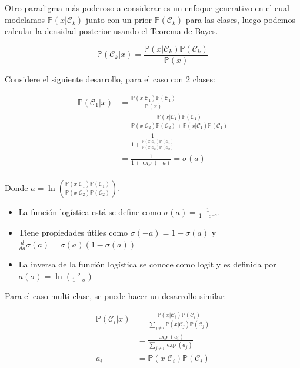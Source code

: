 Otro paradigma más poderoso a considerar es un enfoque generativo en el cual modelamos $\mathbb{P}(x|\mathcal{C}_k)$ junto con un prior $\mathbb{P}(\mathcal{C}_k)$ para las clases, luego podemos calcular la densidad posterior usando el Teorema de Bayes.

\begin{equation}
	\mathbb{P}(\mathcal{C}_k|x) = \frac{\mathbb{P}(x|\mathcal{C}_k)\mathbb{P}(\mathcal{C}_k)}{\mathbb{P}(x)}
\end{equation}

Considere el siguiente desarrollo, para el caso con 2 clases:

\begin{align}
	\mathbb{P}(\mathcal{C}_1|x) &= \frac{\mathbb{P}(x|\mathcal{C}_1)\mathbb{P}(\mathcal{C}_1)}{\mathbb{P}(x)}\\
	&= \frac{\mathbb{P}(x|\mathcal{C}_1)\mathbb{P}(\mathcal{C}_1)}{\mathbb{P}(x|\mathcal{C}_2)\mathbb{P}(\mathcal{C}_2)+\mathbb{P}(x|\mathcal{C}_1)\mathbb{P}(\mathcal{C}_1)}\\
	&=\frac{1}{1+\frac{\mathbb{P}(x|\mathcal{C}_1)\mathbb{P}(\mathcal{C}_1)}{\mathbb{P}(x|\mathcal{C}_2)\mathbb{P}(\mathcal{C}_2)}}\\
	&=\frac{1}{1+\exp(-a)} = \sigma(a)\\
\end{align}

Donde $a = \ln(\frac{\mathbb{P}(x|\mathcal{C}_1)\mathbb{P}(\mathcal{C}_1)}{\mathbb{P}(x|\mathcal{C}_2)\mathbb{P}(\mathcal{C}_2)})$.

\begin{itemize}
	\item La función logística está se define como $\sigma(a) = \frac{1}{1+e^{-a}}$.
	
	\item Tiene propiedades útiles como $\sigma(-a)=1-\sigma(a)$ y $\frac{d}{da}\sigma(a)=\sigma(a)(1-\sigma(a))$
	
	\item La inversa de la función logística se conoce como logit y es definida por $a(\sigma)=\ln(\frac{\sigma}{1-\sigma})$
\end{itemize}

Para el caso multi-clase, se puede hacer un desarrollo similar:

\begin{align}
	\mathbb{P}(\mathcal{C}_i | x) &= \frac{\mathbb{P}(x | \mathcal{C}_i)\mathbb{P}(\mathcal{C}_i)}{\sum_{j\neq i}\mathbb{P}(x | \mathcal{C}_j)\mathbb{P}(\mathcal{C}_j)}\\
	&= \frac{\exp(a_i)}{\sum_{j\neq i}\exp(a_j)}\\
	a_i &= \mathbb{P}(x | \mathcal{C}_i)\mathbb{P}(\mathcal{C}_i)
\end{align}

